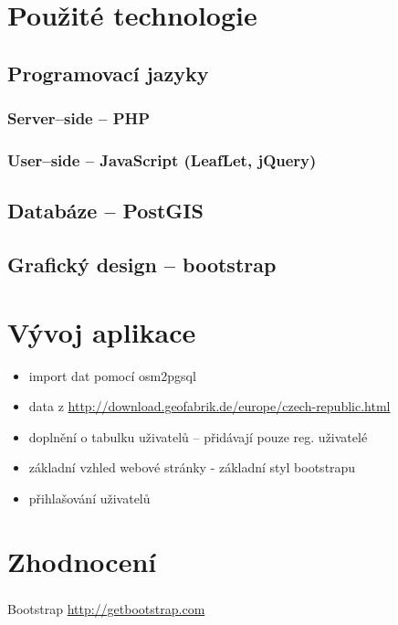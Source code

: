 \documentclass[11pt,a4paper,titlepage,oneside]{book}
\begin{document}
\chapter{Použité technologie}
	\section{Programovací jazyky}
		\subsection{Server--side -- PHP}
			
		\subsection{User--side -- JavaScript (LeafLet, jQuery)}
	\section{Databáze -- PostGIS}
	\section{Grafický design -- bootstrap \cite{bootstrap}}

\chapter{Vývoj aplikace}
		\begin{itemize}
			\item import dat pomocí osm2pgsql
			\item data z \url{http://download.geofabrik.de/europe/czech-republic.html}
			\item doplnění o tabulku uživatelů -- přidávají pouze reg. uživatelé
			\item základní vzhled webové stránky - základní styl bootstrapu
			\item přihlašování uživatelů
		\end{itemize}

	\chapter{Zhodnocení}
		\paragraph{}

\newpage
{}
\begin{thebibliography}{50}
	Bootstrap \url{http://getbootstrap.com}
\end{thebibliography}
\end{document}

